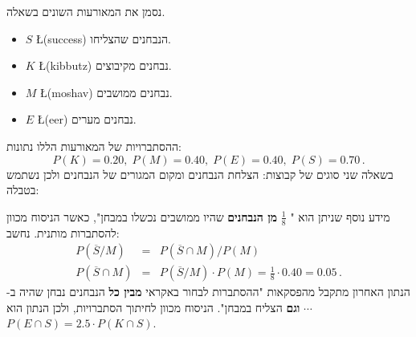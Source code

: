 נסמן את המאורעות השונים בשאלה.
\begin{itemize}
\item $S$ \L{(success)}
הנבחנים שהצליחו.
\item $K$ \L{(kibbutz)} 
נבחנים מקיבוצים.
\item $M$ \L{(moshav)}
נבחנים ממושבים.
\item $E$ \L{(eer)}
נבחנים מערים.
\end{itemize}
ההסתברויות של המאורעות הללו נתונות:
\[
P(K)=0.20,\;P(M)=0.40,\;P(E)=0.40,\;P(S)=0.70\,.
\]
בשאלה שני סוגים של קבוצות: הצלחת הנבחנים ומקום המגורים של הנבחנים ולכן נשתמש בטבלה:
\begin{center}
\end{center}
מידע נוסף שניתן הוא "%
$\frac{1}{8}$
\textbf{מן הנבחנים}
שהיו ממושבים נכשלו במבחן", כאשר הניסוח מכוון להסתברות מותנית. נחשב:
\begin{eqnarray*}
P(\overline{S}/M)&=&P(\overline{S}\cap M) / P(M)\\
P(\overline{S}\cap M)&=&P(\overline{S}/M)\cdot P(M)=\frac{1}{8}\cdot 0.40=0.05\,.
\end{eqnarray*}
%
%
%
%
%
הנתון האחרון מתקבל מהפסקאות "ההסתברות לבחור באקראי
\textbf{מבין כל}
הנבחנים נבחן שהיה ב-%
$\cdots$
\textbf{וגם}
הצליח במבחן". הניסוח מכוון לחיתוך הסתברויות, ולכן הנתון הוא
$P(E\cap S)=2.5\cdot P(K\cap S)$.

